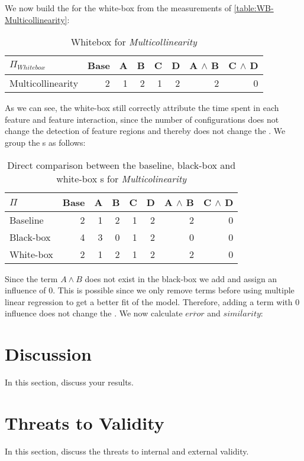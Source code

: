We now build the \perfInfluenceModel for the white-box from the measurements of \autoref{table:WB-Multicollinearity}:

\begin{table}[H]
    \centering
    \begin{tabular}{lrrrrrrr}
    \toprule
    $\Pi_{Whitebox}$    & Base & A & B & C & D & A $\land$ B & C $\land$ D  \\
    \midrule
    Multicollinearity &   2 &  1 &  2 &  1 &  2 &   2 &  0 \\
    \bottomrule
    \end{tabular}
    \caption{Whitebox {\perfInfluenceModel} for \emph{Multicollinearity}}
\end{table}

As we can see, the white-box {\perfInfluenceModel} still correctly attribute the time spent in each feature and feature
interaction, since the number of configurations does not change the detection of feature regions and thereby does not 
change the \perfInfluenceModel. We group the {\perfInfluenceModel}s as follows:

\begin{table}[H]
    \centering
    \begin{tabular}{lrrrrrrr}
    \toprule
    $\Pi$    & Base & A & B & C & D & A $\land$ B & C $\land$ D  \\ \midrule
    Baseline & 2    & 1 & 2 & 1 & 2 & 2           & 0            \\
    Black-box & 4   & 3 & 0 & 1 & 2 & 0           & 0            \\
    White-box & 2   & 1 & 2 & 1 & 2 & 2           & 0            \\ \bottomrule
    \end{tabular}  
    \caption{Direct comparison between the baseline, black-box and white-box {\perfInfluenceModel}s for \emph{Multicolinearity}}
    \label{aggr:results-mullti  }
\end{table}

Since the term $A \land B$ does not exist in the black-box {\perfInfluenceModel} we add and assign an influence of 0. 
This is possible since we only remove terms before using multiple linear regression to get a better fit of the model.
Therefore, adding a term with 0 influence does not change the {\perfInfluenceModel}. 
We now calculate $\overline{error}$ and $\overline{similarity}$:

\section{Discussion}\label{sec:discussion}

In this section, discuss your results.

\section{Threats to Validity}\label{sec:threats}

In this section, discuss the threats to internal and external validity.
